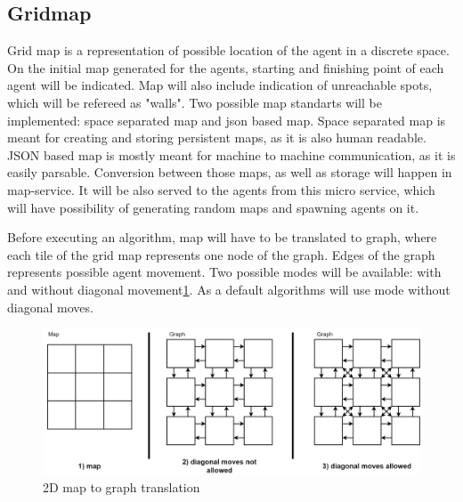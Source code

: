 \subsection{Gridmap}
Grid map is a representation of possible location of the agent in a discrete space. On the initial map generated for the agents, starting and finishing point of each agent will be indicated. Map will also include indication of unreachable spots, which will be refereed as "walls". Two possible map standarts will be implemented: space separated map and json based map. Space separated map is meant for creating and storing persistent maps, as it is also human readable. JSON based map is mostly meant for machine to machine communication, as it is easily parsable. Conversion between those maps, as well as storage will happen in map-service. It will be also served to the agents from this micro service, which will have possibility of generating random maps and spawning agents on it.

Before executing an algorithm, map will have to be translated to graph, where each tile of the grid map represents one node of the graph. Edges of the graph represents possible agent movement. Two possible modes will be available: with and without diagonal movement\ref{fig:map_2D}. As a default algorithms will use mode without diagonal moves.

\begin{figure}[H]
    \centering
    \includegraphics[width=\textwidth]{pictures/map_2d.png}
    \caption{ 2D map to graph translation }
    \label{fig:map_2D}
\end{figure}


